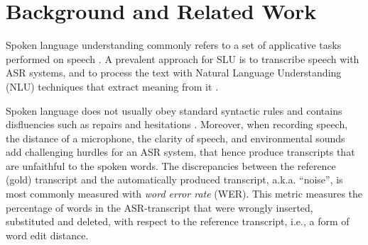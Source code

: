 \section{Background and Related Work}
\label{sec_related_work}

Spoken language understanding \citep[SLU;][]{wang2005slu} commonly refers to a set of applicative tasks performed on speech \citep{feng2022asrglue, shon-etal-2023-slue}. A prevalent approach for SLU is to transcribe speech with ASR systems, and to process the text with Natural Language Understanding (NLU) techniques that extract meaning from it \citep{tur2011slu}.

Spoken language does not usually obey standard syntactic rules and contains disfluencies such as repairs and hesitations \citep{wang2005slu}. Moreover, when recording speech, the distance of a microphone, the clarity of speech, and environmental sounds add challenging hurdles for an ASR system, that hence produce transcripts that are unfaithful to the spoken words. The discrepancies between the reference (gold) transcript and the automatically produced transcript, a.k.a. ``noise'', is most commonly measured with \textit{word error rate} (WER). This metric measures the percentage of words in the ASR-transcript that were wrongly inserted, substituted and deleted, with respect to the reference transcript, i.e., a form of word edit distance.

